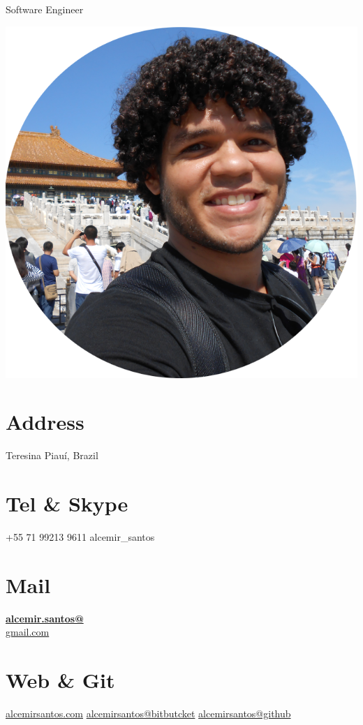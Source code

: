 \documentclass[]{friggeri-cv}
\begin{document}
  \vspace{1cm}
      {Software Engineer}
      

\begin{aside}
  \includegraphics[scale=0.18]{img/eu-circle.png}
  \section{Address}
    Teresina
    Piauí, Brazil
    ~
  \section{Tel \& Skype}
    +55 71  99213 9611
    alcemir\_santos
    ~
  \section{Mail}
    \href{mailto:alcemir.santos@gmail.com}{\textbf{alcemir.santos@}\\gmail.com}
    ~
  \section{Web \& Git}
    \href{http://alcemirsantos.com}{alcemirsantos.com}
    \href{https://bitbucket.org/alcemirsantos}{alcemirsantos@bitbutcket}
        \href{https://github.com/alcemirsantos}{alcemirsantos@github}
    ~

\end{aside}
\end{document}
